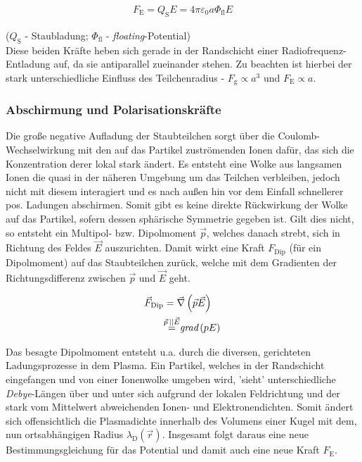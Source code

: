 \documentclass[numbers=noenddot,a4paper]{scrartcl}
\newcommand{\ix}[1]{_\text{#1}}
\newcommand{\tilt}[1]{\textit{#1}}
\newcommand{\grad}[1]{\textit{grad}\left(#1\right)}
\begin{document}
				\begin{align}
				F\ix{E}=Q\ix{S} E=4 \pi \varepsilon\ix{0} a \Phi\ix{fl} E
				\end{align}

			($Q\ix{S}$ - Staubladung; $\Phi\ix{fl}$ - \tilt{floating}-Potential)\\
			Diese beiden Kräfte heben sich gerade in der Randschicht einer Radiofrequenz-Entladung auf, da sie antiparallel zueinander stehen. Zu beachten ist hierbei der stark unterschiedliche Einfluss des Teilchenradius - $F\ix{g}\propto a^3$ und $F\ix{E}\propto a$.\\

			\subsubsection{Abschirmung und Polarisationskräfte}\label{subsub:abschirm}

			Die große negative Aufladung der Staubteilchen sorgt über die Coulomb-Wechselwirkung mit den auf das Partikel zuströmenden Ionen dafür, das sich die Konzentration derer lokal stark ändert. Es entsteht eine Wolke aus langsamen Ionen die quasi in der näheren Umgebung um das Teilchen verbleiben, jedoch nicht mit diesem interagiert und es nach außen hin vor dem Einfall schnellerer pos. Ladungen abschirmen. Somit gibt es keine direkte Rückwirkung der Wolke auf das Partikel, sofern dessen sphärische Symmetrie gegeben ist. Gilt dies nicht, so entsteht ein Multipol- bzw. Dipolmoment $\vec{p}$, welches danach strebt, sich in Richtung des Feldes $\vec{E}$ auszurichten. Damit wirkt eine Kraft $F\ix{Dip}$ (für ein Dipolmoment) auf das Staubteilchen zurück, welche mit dem Gradienten der Richtungsdifferenz zwischen $\vec{p}$ und $\vec{E}$ geht.

				\begin{align}
					\centering
					\vec{F}\ix{Dip}&=\vec{\nabla}\left(\vec{p}\vec{E}\right)\\
					&{\overset{\vec{p}\,||\vec{E}}{=}}\grad{pE} \nonumber
				\end{align}

			Das besagte Dipolmoment entsteht u.a. durch die diversen, gerichteten Ladungsprozesse in dem Plasma. Ein Partikel, welches in der Randschicht eingefangen und von einer Ionenwolke umgeben wird, 'sieht' unterschiedliche \tilt{Debye}-Längen über und unter sich aufgrund der lokalen Feldrichtung und der stark vom Mittelwert abweichenden Ionen- und Elektronendichten. Somit ändert sich offensichtlich die Plasmadichte innerhalb des Volumens einer Kugel mit dem, nun ortsabhängigen Radius $\lambda\ix{D}\left(\vec{r}\right)$. Insgesamt folgt daraus eine neue Bestimmungsgleichung für das Potential und damit auch eine neue Kraft $F\ix{E}$.
\end{document}

